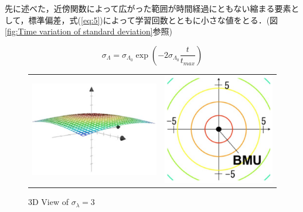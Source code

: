先に述べた，近傍関数によって広がった範囲が時間経過にともない縮まる要素として，標準偏差，式(\ref{eq:5})によって学習回数とともに小さな値をとる．(図\ref{fig:Time variation of standard deviation}参照)

\begin{equation}
\label{eq:5}
\sigma_\Lambda={\sigma_{\Lambda_0}}\exp(-2{\sigma_{\Lambda_0}}\frac{t}{t_{max}})
\end{equation}

\begin{figure}[H]%
    \begin{tabular}{cc}
      \begin{minipage}[t]{0.45\hsize}
        \centering
        \includegraphics[keepaspectratio, scale=0.8]{Figure/Sigma_3_3D.eps}
        \caption{3D View of $\sigma_\lambda =3 $}
        \label{fig:Sigma_3_3D}
      \end{minipage} &
      \begin{minipage}[t]{0.45\hsize}
        \centering
        \includegraphics[keepaspectratio, scale=0.8]{Figure/Sigma_3_2D.eps}

\end{minipage}
\end{tabular}
\end{figure}
